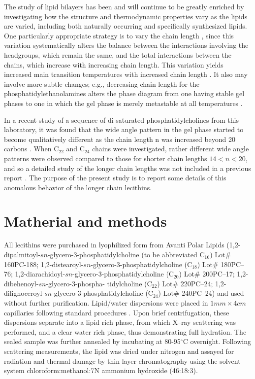 The study of lipid bilayers has been and will continue to be greatly enriched
by investigating how the structure and thermodynamic properties vary as the 
lipids are varied, including both naturally occurring and specifically
synthesized lipids. One particularly appropriate strategy is to vary the chain 
length \cite{NW78,LMc87,Huang94,Cev91}, since this variation systematically 
alters the balance between the interactions involving the headgroups,
which remain the same, and the total interactions between the chains, which 
increase with increasing chain length. This variation yields increased main 
transition temperatures with increased chain length \cite{NW78,LMc87,Huang94,%
Cev91}. It also may involve more subtle changes; e.g., decreasing chain length 
for the phosphatidylethanolamines alters the phase diagram from one having
stable gel phases to one in which the gel phase is merely metastable at all 
temperatures \cite{WN84}.

In a recent study of a sequence of di-saturated phosphatidylcholines from
this laboratory, it was found that the wide angle pattern in the gel phase
started to become qualitatively different as the chain length n was increased
beyond 20 carbons \cite{STN92}. When C$_{22}$ and C$_{24}$ chains were 
investigated, rather different wide angle patterns were observed compared to 
those for shorter chain lengths $14 < n < 20$, and so a detailed study of the 
longer chain lengths was not included in a previous report \cite{STN92}. The 
purpose of the present study is to report some details of this anomalous 
behavior of the longer chain lecithins.

\section{Matherial and methods}

All lecithins were purchased in lyophilized form from Avanti Polar Lipids
(1,2-dipalmitoyl-$sn$-glycero-3-phosphatidylcholine (to be abbreviated 
C$_{16}$) Lot\# 160PC-188; 1,2-distearoyl-$sn$-glycero-3-phosphatidylcholine 
(C$_{18}$) Lot\# 180PC--76; 1,2-diarachidoyl-$sn$-glycero-3-phosphatidylcholine 
(C$_{20}$) Lot\# 200PC--17; 1,2-dibehenoyl-$sn$-glycero-3-phospha- tidylcholine
(C$_{22}$) Lot\# 220PC--24; 1,2-dilignoceroyl-$sn$-glycero-3-phosphatidylcholine
(C$_{24}$) Lot\# 240PC--24) and used without further purification.
Lipid/water dispersions were placed in $1mm \times 4cm$ capillaries following 
standard procedures \cite{STN92}. Upon brief centrifugation, these dispersions 
separate into a lipid rich phase, from which X--ray scattering was performed, 
and a clear water rich phase, thus demonstrating full hydration.  The sealed 
sample was further annealed by incubating at 80-95$^{\circ}$C overnight. 
Following scattering measurements, the lipid was dried under nitrogen
and assayed for radiation and thermal damage by thin layer chromatography 
using the solvent system chloroform:methanol:7N ammonium hydroxide (46:18:3).

